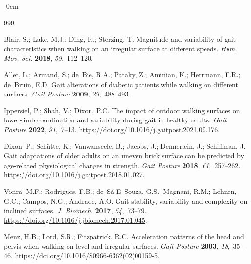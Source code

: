 \documentclass[sensors,article,accept,pdftex,moreauthors]{Definitions/mdpi}
\begin{document}
\begin{adjustwidth}{-\extralength}{0cm}


\begin{thebibliography}{999}

Blair, S.; Lake, M.J.; Ding, R.; Sterzing, T.
 Magnitude and variability of gait characteristics when walking on an
  irregular surface at different speeds.
 {\em Hum. Mov. Sci.} {\bf 2018}, {\em 59},~112--120.

Allet, L.; Armand, S.; de~Bie, R.A.; Pataky, Z.; Aminian, K.; Herrmann, F.R.;
  de~Bruin, E.D.
 Gait alterations of diabetic patients while walking on different
  surfaces.
 {\em Gait Posture} {\bf 2009}, {\em 29},~488--493.

Ippersiel, P.; Shah, V.; Dixon, P.C.
 The impact of outdoor walking surfaces on lower-limb coordination and
  variability during gait in healthy adults.
 {\em Gait Posture} {\bf 2022}, {\em 91},~7--13.
 {\url{https://doi.org/10.1016/j.gaitpost.2021.09.176}}.

Dixon, P.; Schütte, K.; Vanwanseele, B.; Jacobs, J.; Dennerlein, J.;
  Schiffman, J.
 Gait adaptations of older adults on an uneven brick surface can be
  predicted by age-related physiological changes in strength.
 {\em Gait Posture} {\bf 2018}, {\em 61},~257--262.
  {\url{https://doi.org/10.1016/j.gaitpost.2018.01.027}}.

Vieira, M.F.; Rodrigues, F.B.; de~Sá E~Souza, G.S.; Magnani, R.M.; Lehnen,
  G.C.; Campos, N.G.; Andrade, A.O.
 Gait stability, variability and complexity on inclined surfaces.
 {\em J. Biomech.} {\bf 2017}, {\em 54},~73--79.
 {\url{https://doi.org/10.1016/j.jbiomech.2017.01.045}}.

Menz, H.B.; Lord, S.R.; Fitzpatrick, R.C.
 Acceleration patterns of the head and pelvis when walking on level
  and irregular surfaces.
 {\em Gait Posture} {\bf 2003}, {\em 18},~35--46.
 {\url{https://doi.org/10.1016/S0966-6362(02)00159-5}}.


\end{thebibliography}
\end{adjustwidth}
\end{document}
